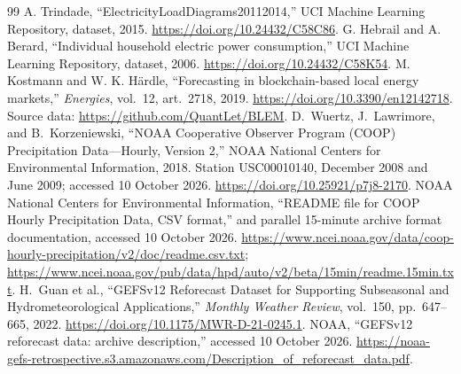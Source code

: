 \documentclass[12pt]{article}
\begin{document}
\begin{thebibliography}{99}
 A. Trindade, ``ElectricityLoadDiagrams20112014,''
UCI Machine Learning Repository, dataset, 2015.
\url{https://doi.org/10.24432/C58C86}.
 G. Hebrail and A. Berard, ``Individual household electric
power consumption,'' UCI Machine Learning Repository, dataset, 2006.
\url{https://doi.org/10.24432/C58K54}.
 M. Kostmann and W. K. H\"ardle,
``Forecasting in blockchain-based local energy markets,''
\emph{Energies}, vol.~12, art.~2718, 2019.
\url{https://doi.org/10.3390/en12142718}.
Source data: \url{https://github.com/QuantLet/BLEM}.
D.~Wuertz, J.~Lawrimore, and B.~Korzeniewski,
``NOAA Cooperative Observer Program (COOP) Precipitation Data---Hourly,
Version 2,'' NOAA National Centers for Environmental Information, 2018.
Station USC00010140, December 2008 and June 2009; accessed 10 October 2026.
\url{https://doi.org/10.25921/p7j8-2170}.
NOAA National Centers for Environmental Information,
``README file for COOP Hourly Precipitation Data, CSV format,''
and parallel 15-minute archive format documentation, accessed 10 October 2026.
\url{https://www.ncei.noaa.gov/data/coop-hourly-precipitation/v2/doc/readme.csv.txt};
\url{https://www.ncei.noaa.gov/pub/data/hpd/auto/v2/beta/15min/readme.15min.txt}.
H.~Guan et al., ``GEFSv12 Reforecast Dataset for Supporting Subseasonal
and Hydrometeorological Applications,'' \emph{Monthly Weather Review},
vol.~150, pp.~647--665, 2022.
\url{https://doi.org/10.1175/MWR-D-21-0245.1}.
NOAA, ``GEFSv12 reforecast data: archive description,'' accessed 10 October 2026.
\url{https://noaa-gefs-retrospective.s3.amazonaws.com/Description_of_reforecast_data.pdf}.
\end{thebibliography}
\end{document}
